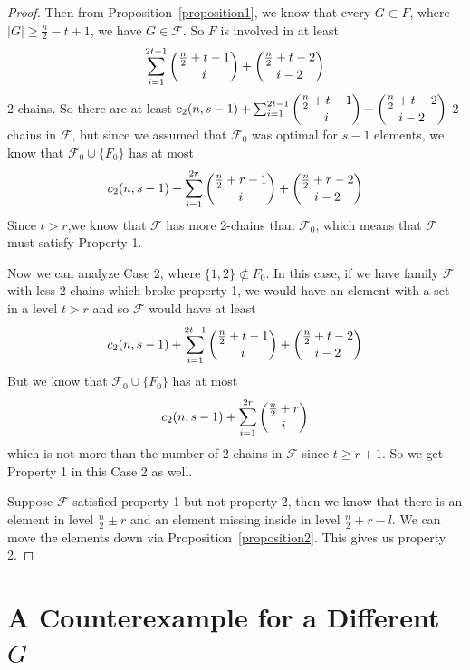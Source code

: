 \documentclass[12pt]{article}
\theoremstyle{plain}
\theoremstyle{definition}
\theoremstyle{remark}
\newcommand{\F}{\mathcal{F}}
\begin{document}
\begin{proof}
Then from Proposition~\ref{proposition1}, we know that every $G \subset F$, where $|G| \geq \frac{n}{2}-t+1$, we have $G \in \F$. So $F$ is involved in at least
\[ \sum_{i=1}^{2t-1} \dbinom{\frac{n}{2}+t - 1}{i} + \dbinom{\frac{n}{2}+t-2}{i-2}\]
2-chains. So there are at least $c_2(n, s-1) + \sum_{i=1}^{2t-1} \dbinom{\frac{n}{2}+t - 1}{i} + \dbinom{\frac{n}{2}+t-2}{i-2}$ 2-chains in $\F$, but since we assumed that $\F_0$ was optimal for $s-1$ elements, we know that $\F_0 \cup \{F_0\}$ has at most
\[ c_2(n, s-1) + \sum_{i=1}^{2r} \dbinom{\frac{n}{2}+r - 1}{i} + \dbinom{\frac{n}{2}+r-2}{i-2} \]
Since $t > r$,we know that $\F$ has more 2-chains than $\F_0$, which means that $\F$ must satisfy Property 1.

Now we can analyze Case 2, where $\{ 1, 2\} \not\subset F_0$. In this case, if we have family $\F$ with less 2-chains which broke property 1, we would have an element with a set in a level $t > r$ and so $\F$ would have at least
\[ c_2(n, s-1) + \sum_{i=1}^{2t-1} \dbinom{\frac{n}{2}+t-1}{i} + \dbinom{\frac{n}{2}+t-2}{i-2} \]
But we know that $\F_0 \cup \{ F_0\}$ has at most
\[ c_2(n,s-1) + \sum_{i=1}^{2r} \dbinom{\frac{n}{2}+r}{i} \]
which is not more than the number of 2-chains in $\F$ since $t \geq r + 1$. So we get Property 1 in this Case 2 as well. 

Suppose $\F$ satisfied property 1 but not property 2, then we know that there is an element in level $\frac{n}{2} \pm r$ and an element missing inside in level $\frac{n}{2}+r-l$. We can move the elements down via Proposition~\ref{proposition2}. This gives us property 2. 
\end{proof}

\section{A Counterexample for a Different $G$}
\end{document}

